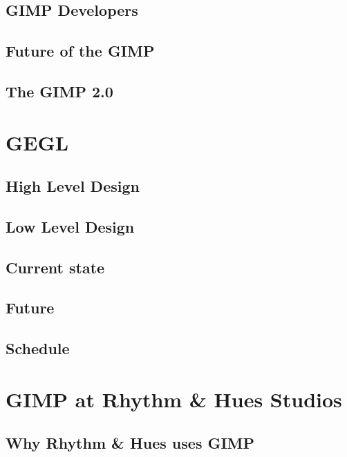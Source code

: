 \documentclass{report}
\begin{document}
\section{GIMP Developers}
\section{Future of the GIMP} 

\section{The GIMP 2.0}



\chapter{GEGL}

\section{High Level Design}

\section{Low Level Design}

\section{Current state}

\section{Future}

\section{Schedule}

\chapter{GIMP at Rhythm \& Hues Studios}

\section{Why Rhythm \& Hues uses GIMP}

\end{document}

